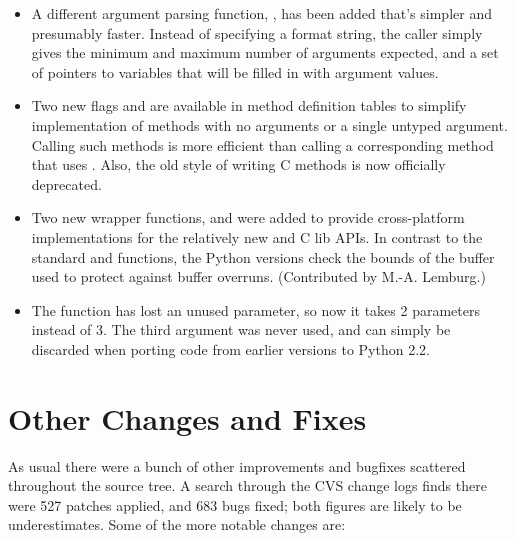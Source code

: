 \documentclass{howto}
\begin{document}
\begin{itemize}
  \item A different argument parsing function,
  , has been added that's simpler and
  presumably faster.  Instead of specifying a format string, the
  caller simply gives the minimum and maximum number of arguments
  expected, and a set of pointers to  variables that
  will be filled in with argument values.  

  \item Two new flags  and  are
   available in method definition tables to simplify implementation of
   methods with no arguments or a single untyped argument. Calling
   such methods is more efficient than calling a corresponding method
   that uses . 
   Also, the old  style of writing C methods is 
   now officially deprecated.  

\item
   Two new wrapper functions,  and
    were added to provide 
   cross-platform implementations for the relatively new
    and  C lib APIs. In
   contrast to the standard  and
    functions, the Python versions check the
   bounds of the buffer used to protect against buffer overruns.
   (Contributed by M.-A. Lemburg.)

   \item The  function has lost an unused
   parameter, so now it takes 2 parameters instead of 3.  The third
   argument was never used, and can simply be discarded when porting
   code from earlier versions to Python 2.2.

\end{itemize}


\section{Other Changes and Fixes}

As usual there were a bunch of other improvements and bugfixes
scattered throughout the source tree.  A search through the CVS change
logs finds there were 527 patches applied, and 683 bugs fixed; both
figures are likely to be underestimates.  Some of the more notable
changes are:
\end{document}
